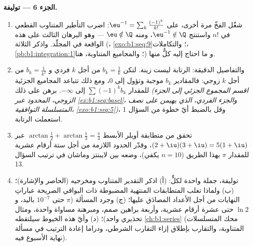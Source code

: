 \begin{problem}
\medskip
\noindent\textbf{الجزء 6 --- توليفة.}
\begin{enumerate}[resume]
  \item شغّل الفخّ مرة أخرى، على $\eu^{-1} = \sum_k
        \frac{(-1)^k}{k!}$: اضرب التأطير المتناوب القطعي
        في $n!$ واستنتج $\eu^{-1} \notin \Q$،
        ومنه $\eu \notin \Q$ --- وهو البرهان الثالث على هذه الواقعة
        في المجلّد. واذكر الثلاثة (،
        \cref{exo:b1:seq:9}؛ والتكاملات،
        \cref{pb:b1:integration:1}؛ والمجاميع المتناوبة، هنا) و
        ما احتاج إليه كلٌّ منها.
  \item والتفاصيل الدقيقة: الرتابة ليست زينة. لتكن
        $b_k = \frac1k$ من أجل $k$ فردي و $b_k = \frac{1}{k^2}$
        من أجل $k$ زوجي: فالمقادير $b_k$ موجبة وتؤول إلى $0$،
        ومع ذلك تتباعد المجاميع الجزئية للمقدار $\sum (-1)^k b_k$ إلى
        $-\infty$. برهن على ذلك \emph{(اقسم المجموع الجزئي إلى
        الجزء الزوجي، المحدود عبر
        \cref{ex:b1:seq:basel}، والجزء الفردي، الذي
        يهيمن على نصف المتسلسلة التوافقية،
        \cref{exo:b1:seq:5})}، وقل بالضبط أيّ خطوة من
        السؤال 1 استعملت الرتابة.
  \item تحقق من متطابقة أويلر الأبسط $\arctan\frac12 +
        \arctan\frac13 = \frac\pi4$ عبر $(2 + \iu)(3 + \iu) =
        5(1 + \iu)$، وقدّر الحدود اللازمة من أجل ستة أرقام عشرية
        للمقدار $\pi$ بهذا الطريق ($n = 10$ يكفي)، وضعه
        بين لايبنتز وماشان في ترتيب السؤال
        13.
  \item توليفة، جملة واحدة لكلٍّ: (أ) اذكر التقدير
        المتناوب ومخرجيه (الحاصر والإشارة)؛ (ب) ولماذا
        تغلب المتطابقات المنتهية المضبوطة ذات البواقي الصريحة
        عباراتِ النهايات من أجل الأعداد المصادَق عليها؛ (ج) وجرد
        المسألة ($\pi$ حتى $10^{-7}$ باليد، و $\ln 2$ حتى
        عشرة أرقام عشرية، وأربعة براهين صمم، ومبرهنة مساواة
        واحدة، ومثال تحذيري واحد)؛ (د) وأيّ هذه
        الخيوط سيلتقطه \cref{ch:b1:series} (محك المتسلسلات
        المتناوبة، والتقارب بإطلاق إزاء التقارب الشرطي،
        ودراما إعادة الترتيب في مسألة نهاية الأسبوع فيه).
\end{enumerate}
\end{problem}

